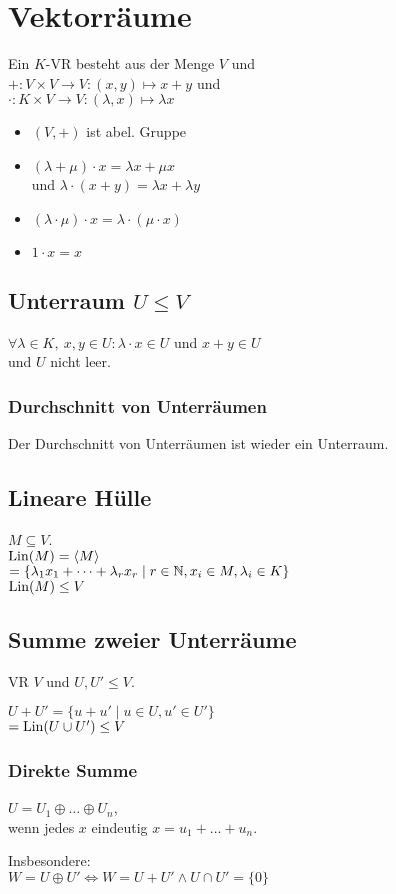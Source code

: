 \section*{Vektorräume}

Ein $K$-VR besteht aus der Menge $V$ und \\
$+: V\times V \to V : (x,y) \mapsto x + y$ und \\
$\cdot : K \times V \to V: (\lambda, x) \mapsto \lambda x$
\begin{itemize}
	\item $(V,+)$ ist abel. Gruppe
	\item $(\lambda + \mu)\cdot x = \lambda x + \mu x$ \\
		und $\lambda\cdot(x+y) = \lambda x + \lambda y$
	\item $(\lambda \cdot \mu)\cdot x = \lambda \cdot (\mu \cdot x)$
	\item $1\cdot x = x$
\end{itemize}

\subsection*{Unterraum $U \le V$}
$\forall \lambda \in K,~ x,y \in U: \lambda\cdot x\in U$ und $x+y\in U$ \\
und $U$ nicht leer.

\subsubsection*{Durchschnitt von Unterräumen}
Der Durchschnitt von Unterräumen ist wieder ein Unterraum.

\subsection*{Lineare Hülle}
$M\subseteq V$. \\
$\operatorname{Lin}(M)=\langle M \rangle$\\
$= \{\lambda_1 x_1 + \dots + \lambda_r x_r \mid r\in\mathbb{N}, x_i \in M, \lambda_i \in K\}$ \\
$\operatorname{Lin}(M)\le V $

\subsection*{Summe zweier Unterräume}
VR $V$ und $U,U' \le V$.

$U + U' = \{u + u' \mid u\in U, u' \in U'\}$ \\
$= \operatorname{Lin}(U\cup U') \le V$

\subsubsection*{Direkte Summe}
$U = U_1 \oplus \dots \oplus U_n$, \\
wenn jedes $x$ eindeutig $x = u_1 + \dots + u_n$.

Insbesondere: \\
$W = U \oplus U' \Leftrightarrow W = U + U' \land U\cap U' = \{0\}$

